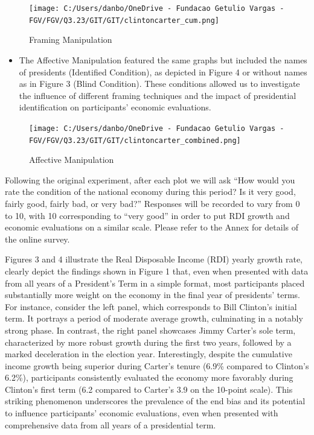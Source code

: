 \documentclass[
]{article}
\providecommand{\tightlist}{%
  \setlength{\itemsep}{0pt}\setlength{\parskip}{0pt}}
\begin{document}
\begin{figure}
\hypertarget{fig:label}{%
\centering
\texttt{[image: C:/Users/danbo/OneDrive - Fundacao Getulio Vargas - FGV/FGV/Q3.23/GIT/GIT/clintoncarter\_cum.png]}
\caption{Framing Manipulation}\label{fig:label}
}
\end{figure}

\begin{itemize}
\tightlist
\item
  The Affective Manipulation featured the same graphs but included the
  names of presidents (Identified Condition), as depicted in Figure 4 or
  without names as in Figure 3 (Blind Condition). These conditions
  allowed us to investigate the influence of different framing
  techniques and the impact of presidential identification on
  participants' economic evaluations.
\end{itemize}

\begin{figure}
\hypertarget{fig:label}{%
\centering
\texttt{[image: C:/Users/danbo/OneDrive - Fundacao Getulio Vargas - FGV/FGV/Q3.23/GIT/GIT/clintoncarter\_combined.png]}
\caption{Affective Manipulation}\label{fig:label}
}
\end{figure}

Following the original experiment, after each plot we will ask ``How
would you rate the condition of the national economy during this period?
Is it very good, fairly good, fairly bad, or very bad?'' Responses will
be recorded to vary from 0 to 10, with 10 corresponding to ``very good''
in order to put RDI growth and economic evaluations on a similar scale.
Please refer to the Annex for details of the online survey.

Figures 3 and 4 illustrate the Real Disposable Income (RDI) yearly
growth rate, clearly depict the findings shown in Figure 1 that, even
when presented with data from all years of a President's Term in a
simple format, most participants placed substantially more weight on the
economy in the final year of presidents' terms. For instance, consider
the left panel, which corresponds to Bill Clinton's initial term. It
portrays a period of moderate average growth, culminating in a notably
strong phase. In contrast, the right panel showcases Jimmy Carter's sole
term, characterized by more robust growth during the first two years,
followed by a marked deceleration in the election year. Interestingly,
despite the cumulative income growth being superior during Carter's
tenure (6.9\% compared to Clinton's 6.2\%), participants consistently
evaluated the economy more favorably during Clinton's first term (6.2
compared to Carter's 3.9 on the 10-point scale). This striking
phenomenon underscores the prevalence of the end bias and its potential
to influence participants' economic evaluations, even when presented
with comprehensive data from all years of a presidential term.
\end{document}
